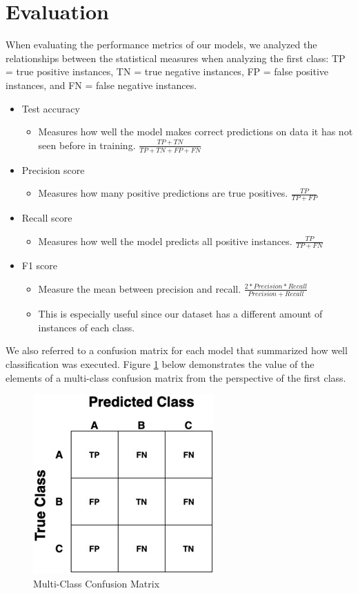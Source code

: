 \graphicspath{ {project_images/} }

\section{Evaluation}
When evaluating the performance metrics of our models, we analyzed the relationships between the statistical measures when analyzing the first class: TP = true positive instances, TN = true negative instances, FP = false positive instances, and FN = false negative instances.

\begin{itemize}
	\item Test accuracy
	\begin{itemize}
		\item Measures how well the model makes correct predictions on data it has not seen before in training. $\frac{TP + TN}{TP + TN + FP + FN}$
	\end{itemize}
	\item Precision score
	\begin{itemize}
		\item Measures how many positive predictions are true positives. $\frac{TP}{TP + FP}$
	\end{itemize}
	\item Recall score
	\begin{itemize}
		\item Measures how well the model predicts all positive instances. $\frac{TP}{TP + FN}$
	\end{itemize}
	\item F1 score
	\begin{itemize}
		\item Measure the mean between precision and recall. $\frac{2 * Precision * Recall}{Precision + Recall}$
		\item This is especially useful since our dataset has a different amount of instances of each class. 
	\end{itemize}
\end{itemize}

We also referred to a confusion matrix for each model that summarized how well classification was executed. Figure \ref{fig:figure3} below demonstrates the value of the elements of a multi-class confusion matrix from the perspective of the first class.

\begin{figure}[h]
	\centering
	\includegraphics[scale=0.4]{multiclass_cfm}
	\caption{Multi-Class Confusion Matrix}
	\label{fig:figure3}
\end{figure}

